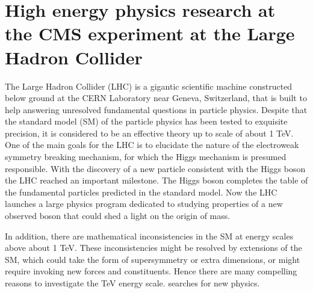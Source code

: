 \section{High energy physics research at the CMS 
     experiment at the Large Hadron Collider}


The Large Hadron Collider (LHC) is a gigantic scientific machine 
constructed 
below ground at the CERN Laboratory near Geneva, Switzerland, 
that is built to help answering unresolved fundamental questions in 
particle physics. 
Despite that the standard model (SM) of the particle physics has been 
tested 
to exquisite precision, it is considered to be an effective theory up to 
scale of about 1 TeV. 
One of the main goals for the LHC is to elucidate the nature of the 
electroweak symmetry
breaking mechanism, for which the Higgs mechanism is presumed responsible. 
With the discovery of a new particle consistent with the Higgs boson the 
LHC reached an important milestone.
The Higgs boson completes the table of the fundamental particles predicted
in the standard model. Now the LHC launches a large physics program 
dedicated 
to studying properties of a new observed boson that could shed a light on 
the origin
of mass.

In addition, there are mathematical inconsistencies in the SM at energy 
scales above about 1 TeV. These inconsistencies might be resolved by 
extensions of the SM, which could take the form 
of supersymmetry or extra dimensions, or might require invoking new forces 
and 
constituents. Hence there are many compelling reasons to investigate the 
TeV energy scale.
searches for new physics. 


